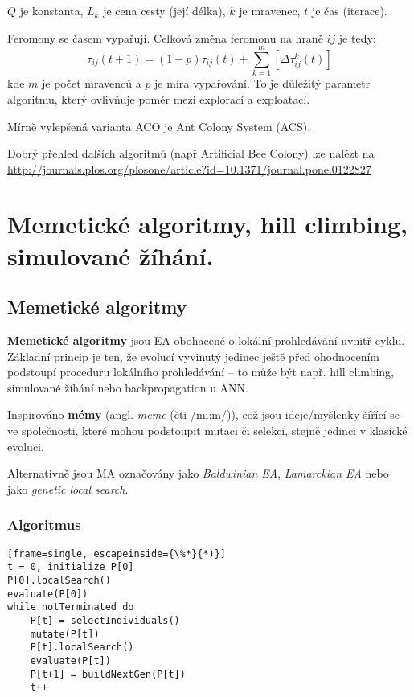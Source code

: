 $Q$ je konstanta, $L_k$ je cena cesty (její délka), $k$ je mravenec, $t$ je čas (iterace).

Feromony se časem vypařují. Celková změna feromonu na hraně $ij$ je tedy:
$$\tau_{ij}(t+1) = (1-p)\tau_{ij}(t) + \sum_{k=1}^m [\Delta\tau^k_{ij}(t)]$$
kde $m$ je počet mravenců a $p$ je míra vypařování. To je důležitý parametr algoritmu, který ovlivňuje poměr mezi explorací a exploatací.

Mírně vylepšená varianta ACO je Ant Colony System (ACS).

Dobrý přehled dalších algoritmů (např Artificial Bee Colony) lze nalézt na \url{http://journals.plos.org/plosone/article?id=10.1371/journal.pone.0122827}






\section{Memetické algoritmy, hill climbing, simulované žíhání.}
\subsection{Memetické algoritmy}

\textbf{Memetické algoritmy} jsou EA obohacené o lokální prohledávání uvnitř cyklu. Základní princip je ten, že evolucí vyvinutý jedinec ještě před ohodnocením podstoupí proceduru lokálního prohledávání -- to může být např. hill climbing, simulované žíhání nebo backpropagation u ANN. 

Inspirováno \textbf{mémy} (angl. \textit{meme} (čti /mi:m/)), což jsou ideje/myšlenky šířící se ve společnosti, které mohou podstoupit mutaci či selekci, stejně jedinci v klasické evoluci. 

Alternativně jsou MA označovány jako \textit{Baldwinian EA}, \textit{Lamarckian EA} nebo jako \textit{genetic local search}.

\subsubsection{Algoritmus}
\begin{minipage}{\linewidth}
	\begin{lstlisting}[frame=single, escapeinside={\%*}{*)}]
t = 0, initialize P[0]
P[0].localSearch()
evaluate(P[0])
while notTerminated do
	P[t] = selectIndividuals()
	mutate(P[t])
	P[t].localSearch()
	evaluate(P[t])
	P[t+1] = buildNextGen(P[t])
	t++

	\end{lstlisting}
\end{minipage}

